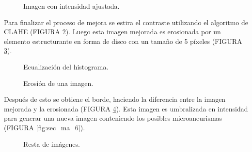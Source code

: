 \begin{figure}[H]
\centering
{}
\caption{Imagen con intensidad ajustada.} \label{fig:sec_ma_2}
\end{figure}

Para finalizar el proceso de mejora se estira el contraste utilizando el algoritmo de CLAHE (FIGURA \ref{fig:sec_ma_3}). Luego esta imagen mejorada es erosionada por un elemento estructurante en forma de disco con un tamaño de 5 píxeles (FIGURA \ref{fig:sec_ma_4}).
\begin{figure}[H]
\centering
{}
\caption{Ecualización del histograma.} \label{fig:sec_ma_3}
\end{figure}
 

\begin{figure}[H]
\centering
{}
\caption{Erosión de una imagen.} \label{fig:sec_ma_4}
\end{figure}

Después de esto se obtiene el borde, haciendo la diferencia entre la imagen mejorada y la erosionada (FIGURA \ref{fig:sec_ma_5}).  %
 Esta imagen es umbralizada en intensidad para generar una nueva imagen conteniendo los posibles microaneurismas (FIGURA \ref{fig:sec_ma_6}).
 \begin{figure}[H]
\centering
{}
\caption{Resta de imágenes.} \label{fig:sec_ma_5}
\end{figure}


